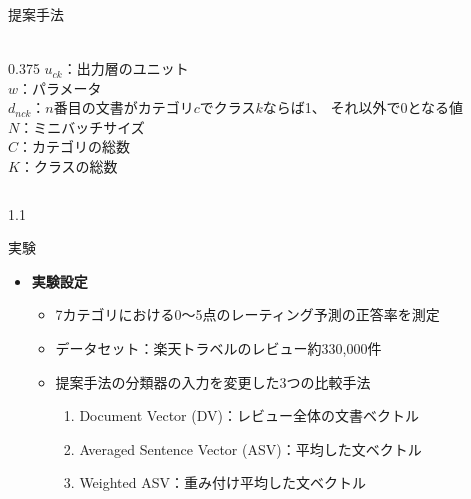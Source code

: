 \documentclass[unicode,10pt]{beamer}
\newlength{\mycolumnwidth}
\newcommand{\itemtitle}[1]{\textbf{#1}\\}
\begin{document}
\begin{frame}[t]
\begin{block}{提案手法}
\begin{columns}[onlytextwidth,t]
\begin{column}{\mycolumnwidth}
\begin{itemize}
{\begin{gather*}
              \nonumber
            \end{gather*}
          }{0.375\linewidth}{
            \small
            $u_{ck}$：出力層のユニット \\
            $w$：パラメータ \\
            $d_{nck}$：$n$番目の文書がカテゴリ$c$でクラス$k$ならば1、
            それ以外で0となる値 \\
            $N$：ミニバッチサイズ \\
            $C$：カテゴリの総数 \\
            $K$：クラスの総数 \\
          }
      \end{itemize}
    \end{column}
  \end{columns}
\end{block}

\begin{columns}[onlytextwidth,t]
  \begin{column}{1.1\mycolumnwidth}
    \begin{block}{実験}
      \begin{itemize}
        \item \itemtitle{実験設定}
          \begin{itemize}
            \item 7カテゴリにおける0〜5点のレーティング予測の正答率を測定
            \item データセット：楽天トラベルのレビュー約330,000件
            \item 提案手法の分類器の入力を変更した3つの比較手法
              \begin{enumerate}
                \item Document Vector (DV)：レビュー全体の文書ベクトル
                \item Averaged Sentence Vector (ASV)：平均した文ベクトル
                \item Weighted ASV：重み付け平均した文ベクトル
              \end{enumerate}
          \end{itemize}
      \end{itemize}


\end{block}
\end{column}
\end{columns}
\end{frame}
\end{document}
